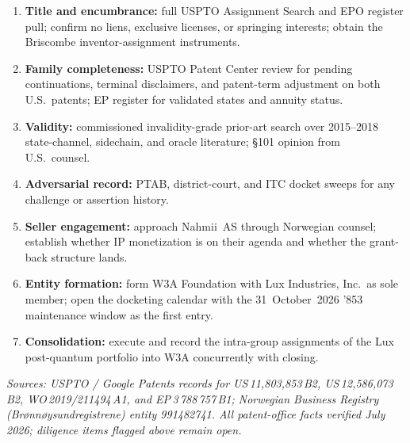 \documentclass[11pt,a4paper]{article}
\begin{document}
\begin{enumerate}[leftmargin=1.6em]
  \item \textbf{Title and encumbrance:} full USPTO Assignment Search
  and EPO register pull; confirm no liens, exclusive licenses, or
  springing interests; obtain the Briscombe inventor-assignment
  instruments.
  \item \textbf{Family completeness:} USPTO Patent Center review for
  pending continuations, terminal disclaimers, and patent-term
  adjustment on both U.S.\ patents; EP register for validated states
  and annuity status.
  \item \textbf{Validity:} commissioned invalidity-grade prior-art
  search over 2015--2018 state-channel, sidechain, and oracle
  literature; \S101 opinion from U.S.\ counsel.
  \item \textbf{Adversarial record:} PTAB, district-court, and ITC
  docket sweeps for any challenge or assertion history.
  \item \textbf{Seller engagement:} approach Nahmii~AS through
  Norwegian counsel; establish whether IP monetization is on their
  agenda and whether the grant-back structure lands.
  \item \textbf{Entity formation:} form W3A Foundation with Lux
  Industries, Inc.\ as sole member; open the docketing calendar with
  the 31~October~2026 '853 maintenance window as the first entry.
  \item \textbf{Consolidation:} execute and record the intra-group
  assignments of the Lux post-quantum portfolio into W3A concurrently
  with closing.
\end{enumerate}

\vspace{1.5em}
\noindent\textit{Sources: USPTO / Google Patents records for
US\,11{,}803{,}853\,B2, US\,12{,}586{,}073\,B2, WO\,2019/211494\,A1, and
EP\,3\,788\,757\,B1; Norwegian Business Registry
(Br{\o}nn{\o}ysundregistrene) entity 991482741. All patent-office facts
verified July 2026; diligence items flagged above remain open.}
\end{document}
